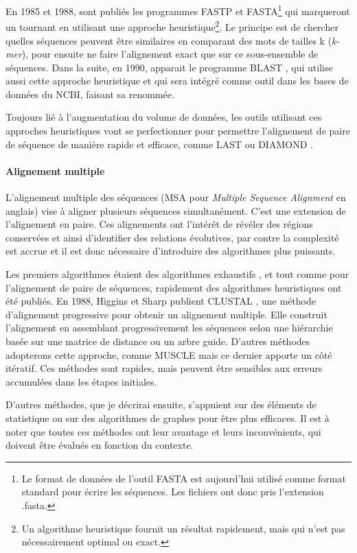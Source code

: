 En 1985 et 1988, sont publiés les programmes FASTP et FASTA\footnote{Le format de données de l'outil FASTA est aujourd'hui utilisé comme format standard pour écrire les séquences. Les fichiers ont donc pris l'extension .fasta.} \cite{lipman_rapid_1985,pearson_improved_1988} qui marqueront un tournant en utilisant une approche heuristique\footnote{Un algorithme heuristique fournit un résultat rapidement, mais qui n'est pas nécessairement optimal ou exact.}. Le principe est de chercher quelles séquences peuvent être similaires en comparant des mots de tailles k (\textit{k-mer}), pour ensuite ne faire l'alignement exact que sur ce sous-ensemble de séquences. Dans la suite, en 1990, apparait le programme BLAST \cite{altschul_basic_1990}, qui utilise aussi cette approche heuristique et qui sera intégré comme outil dans les bases de données du NCBI, faisant sa renommée.  

Toujours lié à l'augmentation du volume de données, les outils utilisant ces approches heuristiques vont se perfectionner pour permettre l'alignement de paire de séquence de manière rapide et efficace, comme LAST \cite{kielbasa_adaptive_2011} ou DIAMOND \cite{buchfink_fast_2015}. 

\paragraph{Alignement multiple}
\label{paragraph:MSA}

L'alignement multiple des séquences (MSA pour \textit{Multiple Sequence Alignment} en anglais) vise à aligner plusieurs séquences simultanément. C'est une extension de l'alignement en paire. Ces alignements ont l'intérêt de révéler des régions conservées et ainsi d'identifier des relations évolutives, par contre la complexité est accrue et il est donc nécessaire d'introduire des algorithmes plus puissants.

Les premiers algorithmes étaient des algorithmes exhaustifs \cite{stoye_multiple_1998}, et tout comme pour l'alignement de paire de séquences, rapidement des algorithmes heuristiques ont été publiés. En 1988, Higgins et Sharp publient CLUSTAL \cite{higgins_clustal_1988}, une méthode d'alignement progressive pour obtenir un alignement multiple. Elle construit l’alignement en assemblant progressivement les séquences selon une hiérarchie basée sur une matrice de distance ou un arbre guide. D'autres méthodes adopterons cette approche, comme MUSCLE \cite{edgar_muscle_2004} mais ce dernier apporte un côté itératif. Ces méthodes sont rapides, mais peuvent être sensibles aux erreurs accumulées dans les étapes initiales.

D'autres méthodes, que je décrirai ensuite, s'appuient sur des éléments de statistique ou sur des algorithmes de graphes pour être plus efficaces. Il est à noter que toutes ces méthodes ont leur avantage et leurs inconvénients, qui doivent être évalués en fonction du contexte.
